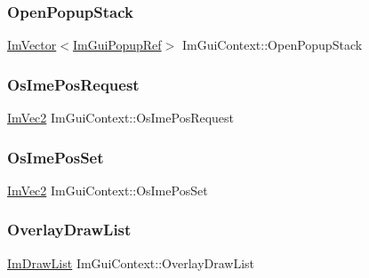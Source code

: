 \subsubsection{\texorpdfstring{Open\+Popup\+Stack}{OpenPopupStack}}
{\footnotesize\ttfamily \hyperlink{class_im_vector}{Im\+Vector}$<$\hyperlink{struct_im_gui_popup_ref}{Im\+Gui\+Popup\+Ref}$>$ Im\+Gui\+Context\+::\+Open\+Popup\+Stack}

\hypertarget{struct_im_gui_context_af98a8f8b9c96bf8b692449daedf45602}{}\label{struct_im_gui_context_af98a8f8b9c96bf8b692449daedf45602} 
\subsubsection{\texorpdfstring{Os\+Ime\+Pos\+Request}{OsImePosRequest}}
{\footnotesize\ttfamily \hyperlink{struct_im_vec2}{Im\+Vec2} Im\+Gui\+Context\+::\+Os\+Ime\+Pos\+Request}

\hypertarget{struct_im_gui_context_a466a0975ad72e7e3deaea6bcfb6b446d}{}\label{struct_im_gui_context_a466a0975ad72e7e3deaea6bcfb6b446d} 
\subsubsection{\texorpdfstring{Os\+Ime\+Pos\+Set}{OsImePosSet}}
{\footnotesize\ttfamily \hyperlink{struct_im_vec2}{Im\+Vec2} Im\+Gui\+Context\+::\+Os\+Ime\+Pos\+Set}

\hypertarget{struct_im_gui_context_abc8e0592d9beea307d78661df0a38b1a}{}\label{struct_im_gui_context_abc8e0592d9beea307d78661df0a38b1a} 
\subsubsection{\texorpdfstring{Overlay\+Draw\+List}{OverlayDrawList}}
{\footnotesize\ttfamily \hyperlink{struct_im_draw_list}{Im\+Draw\+List} Im\+Gui\+Context\+::\+Overlay\+Draw\+List}

\hypertarget{struct_im_gui_context_a4ba950183c7c5e401ca4113e09b1ced4}{}\label{struct_im_gui_context_a4ba950183c7c5e401ca4113e09b1ced4} 
